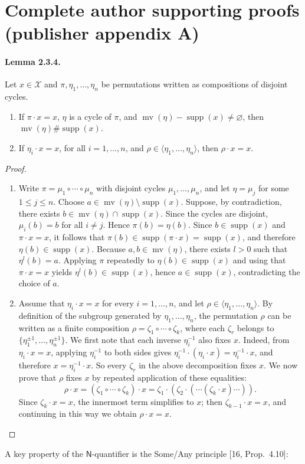 \documentclass[10pt,a4paper]{amsart}
\begin{document}
\section*{Complete author supporting proofs (publisher appendix A)}
\paragraph{Lemma 2.3.4.} Let $x\in\mathcal X$ and $\pi,\eta_1,\ldots,\eta_n$ be permutations written as compositions of disjoint cycles.
\begin{enumerate}
\item If $\pi\cdot x=x$, $\eta$ is a cycle of $\pi$, and $\operatorname{mv}(\eta)-\operatorname{supp}(x)\ne\varnothing$, then $\operatorname{mv}(\eta)\#\operatorname{supp}(x)$.
\item If $\eta_i\cdot x=x$, for all $i=1,\ldots,n$, and $\rho\in\langle\eta_1,\ldots,\eta_n\rangle$, then $\rho\cdot x=x$.
\end{enumerate}
\begin{proof}
\begin{enumerate}
\item Write $\pi=\mu_1\circ\cdots\circ\mu_n$ with disjoint cycles $\mu_1,\ldots,\mu_n$, and let $\eta=\mu_j$ for some $1\le j\le n$. Choose $a\in\operatorname{mv}(\eta)\setminus\operatorname{supp}(x)$.
Suppose, by contradiction, there exists $b\in\operatorname{mv}(\eta)\cap\operatorname{supp}(x)$.
Since the cycles are disjoint, $\mu_i(b)=b$ for all $i\ne j$. Hence $\pi(b)=\eta(b)$.
Since $b\in\operatorname{supp}(x)$ and $\pi\cdot x=x$, it follows that $\pi(b)\in\operatorname{supp}(\pi\cdot x)=\operatorname{supp}(x)$, and therefore $\eta(b)\in\operatorname{supp}(x)$.
Because $a,b\in\operatorname{mv}(\eta)$, there exists $l>0$ such that $\eta^l(b)=a$.
Applying $\pi$ repeatedly to $\eta(b)\in\operatorname{supp}(x)$ and using that $\pi\cdot x=x$ yields $\eta^l(b)\in\operatorname{supp}(x)$, hence $a\in\operatorname{supp}(x)$, contradicting the choice of $a$.
\item Assume that $\eta_i\cdot x=x$ for every $i=1,\ldots,n$, and let $\rho\in\langle\eta_1,\ldots,\eta_n\rangle$.
By definition of the subgroup generated by $\eta_1,\ldots,\eta_n$, the permutation $\rho$ can be written as a finite composition $\rho=\zeta_1\circ\cdots\circ\zeta_k$, where each $\zeta_r$ belongs to $\{\eta_1^{\pm1},\ldots,\eta_n^{\pm1}\}$.
We first note that each inverse $\eta_i^{-1}$ also fixes $x$.
Indeed, from $\eta_i\cdot x=x$, applying $\eta_i^{-1}$ to both sides gives $\eta_i^{-1}\cdot(\eta_i\cdot x)=\eta_i^{-1}\cdot x$, and therefore $x=\eta_i^{-1}\cdot x$.
So every $\zeta_r$ in the above decomposition fixes $x$.
We now prove that $\rho$ fixes $x$ by repeated application of these equalities:
\[
\rho\cdot x=(\zeta_1\circ\cdots\circ\zeta_k)\cdot x=\zeta_1\cdot(\zeta_2\cdot(\cdots(\zeta_k\cdot x)\cdots)).
\]
Since $\zeta_k\cdot x=x$, the innermost term simplifies to $x$; then $\zeta_{k-1}\cdot x=x$, and continuing in this way we obtain $\rho\cdot x=x$.
\end{enumerate}
\end{proof}
A key property of the $\mathsf N$-quantifier is the Some/Any principle [16, Prop.\ 4.10]:
\end{document}
